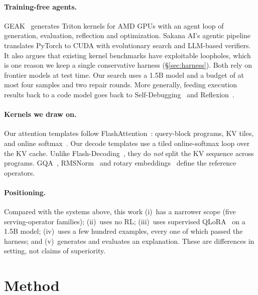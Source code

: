 \documentclass[11pt]{article}
\begin{document}
\paragraph{Training-free agents.}
GEAK~\cite{wang2025geak} generates Triton kernels for AMD GPUs with an agent loop of
generation, evaluation, reflection and optimization. Sakana AI's agentic pipeline~\cite{lange2025robustkbench}
translates PyTorch to CUDA with evolutionary search and LLM-based verifiers. It also argues
that existing kernel benchmarks have exploitable loopholes, which is one reason we keep a
single conservative harness (\S\ref{sec:harness}). Both rely on frontier models at test time.
Our search uses a 1.5B model and a budget of at most four samples and two repair rounds. More
generally, feeding execution results back to a code model goes back to Self-Debugging~\cite{chen2023selfdebug}
and Reflexion~\cite{shinn2023reflexion}.

\paragraph{Kernels we draw on.}
Our attention templates follow FlashAttention~\cite{dao2022flashattention,dao2024flashattention2}:
query-block programs, KV tiles, and online softmax~\cite{milakov2018online}. Our decode templates
use a tiled online-softmax loop over the KV cache. Unlike Flash-Decoding~\cite{dao2023flashdecoding},
they do \emph{not} split the KV sequence across programs. GQA~\cite{ainslie2023gqa},
RMSNorm~\cite{zhang2019rmsnorm} and rotary embeddings~\cite{su2021roformer} define the reference
operators.

\paragraph{Positioning.}
Compared with the systems above, this work (i)~has a narrower scope (five serving-operator families);
(ii)~uses no RL; (iii)~uses supervised QLoRA~\cite{dettmers2023qlora} on a 1.5B model;
(iv)~uses a few hundred examples, every one of which passed the harness; and (v)~generates and evaluates an
explanation. These are differences in setting, not claims of superiority.

\section{Method}
\label{sec:method}
\end{document}
